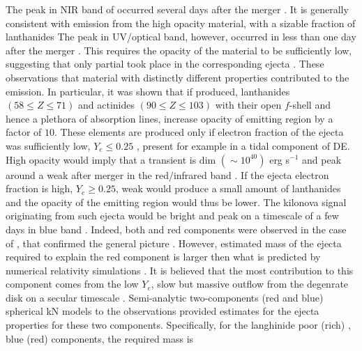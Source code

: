 %
The peak in \ac{NIR} band of \AT{} occurred several days after the merger \citep{Chornock:2017sdf}.
It is generally consistent with emission from the high opacity material, with a sizable 
fraction of lanthanides \citep{Kasen:2013xka}
%
The peak in \ac{UV}/optical band, however, occurred in less than one day after the merger 
\citep{Nicholl:2017ahq}. This requires the opacity of the material to be sufficiently low, 
suggesting that only partial \rproc{} \nuc{} took place in the corresponding ejecta 
\citep{Martin:2015hxa}.
%
These observations that material with distinctly different properties contributed to the emission.
%
In particular, it was shown that if produced, 
lanthanides $(58\leq Z \leq71)$ and actinides $(90\leq Z \leq 103)$ with their open $f$-shell 
and hence a plethora of absorption lines, increase opacity of emitting region by a factor of $10$. 
%
These elements are produced only if electron fraction of the ejecta was sufficiently low, 
$Y_e\leq 0.25$ \citep{Lippuner:2015gwa}, present for example in a tidal component of \ac{DE}. 
High opacity would imply that a transient is dim $(\sim10^{40})$ erg s$^{-1}$ and peak around a 
weak after merger in the red/infrared band \citep{Barnes:2013wka,Grossman:2013lqa,Lippuner:2015gwa}. 
%
If the ejecta electron fraction is high, $Y_e \geq 0.25$, weak \rproc{} would produce a small amount 
of lanthanides and the opacity of the emitting region would thus be lower. The kilonova signal originating 
from such ejecta would be bright and peak on a timescale of a few days in blue band 
\citep{Kasen:2014toa,Martin:2015hxa}. 
%
%
Indeed, both and red components were observed in the case of \AT{}, that confirmed the general 
picture \citep[\eg][]{Villar:2017wcc}. However, estimated mass of the ejecta required to explain 
the red component is larger then what is predicted by numerical relativity simulations . 
It is believed that the most contribution to this component comes from the low $Y_e$, slow but 
massive outflow from the degenrate disk on a secular timescale .
%
Semi-analytic two-components (red and blue) spherical \ac{kN} models to the \AT{} observations 
provided estimates for the ejecta properties for these two components. 
%
Specifically, for the langhinide poor (rich) \ie, blue (red) components, the required mass is 
